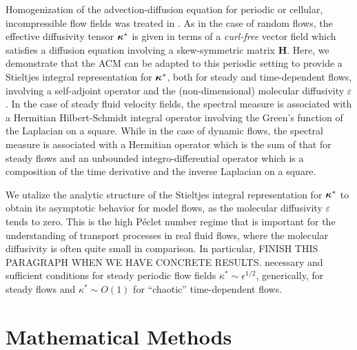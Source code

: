 \documentclass[11pt]{amsart}
\newcommand{\Hb}{\mathbf{H}}
\newcommand\bkappa{\mbox{\boldmath${\kappa}$}}
\begin{document}
Homogenization of the advection-diffusion equation for periodic or
cellular, incompressible flow fields was treated in
\cite{Fannjiang:SIAM_JAM:333,Fannjiang:1997:1033}. As in the case of
random flows, the effective diffusivity tensor
$\bkappa^*$ is given in terms of a \emph{curl-free} vector field which
satisfies a diffusion equation involving a skew-symmetric
matrix $\Hb$. Here, we demonstrate that the ACM can
be adapted to this periodic setting to provide a Stieltjes
integral representation for $\bkappa^*$, both for steady and
time-dependent flows, involving a self-adjoint operator and the
(non-dimensional) molecular diffusivity $\varepsilon$. In the case of steady
fluid velocity fields, the spectral measure is associated with a
Hermitian Hilbert-Schmidt integral operator involving the Green's
function of the Laplacian on a square. While in the case of dynamic
flows, the spectral measure is associated with a Hermitian operator
which is the sum of that for steady flows and an unbounded
integro-differential operator which is a composition of the time
derivative and the inverse Laplacian on a square.     
 

We utalize the analytic structure of the Stieltjes integral
representation for $\bkappa^*$ to obtain its asymptotic behavior for
model flows, as the molecular diffusivity $\varepsilon$ tends to zero. This is
the high P\'{e}clet number regime that is important for the
understanding of transport processes in real fluid flows, where the
molecular diffusivity is often quite small in comparison. In
particular, FINISH THIS PARAGRAPH WHEN WE HAVE CONCRETE RESULTS.
necessary and sufficient conditions for steady periodic flow
fields $\kappa^*\sim\epsilon^{1/2}$, generically, for steady flows and $\kappa^*\sim O(1)$ for
``chaotic'' time-dependent flows. 

%
\section{Mathematical Methods}\label{sec:Mathematical_Methods} 
%
\end{document}
